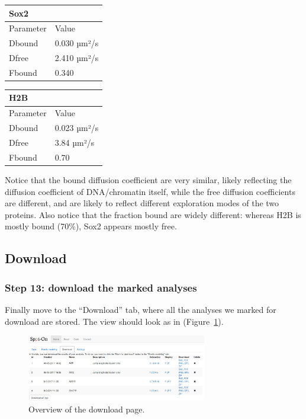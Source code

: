 \begin{center}
  \label{table:table9}
\begin{tabular}{ll}
Sox2 & \\
\hline
Parameter & Value\\
\hline
Dbound & 0.030 µm²/s\\
Dfree & 2.410 µm²/s\\
Fbound & 0.340\\
\end{tabular}
\end{center}

\begin{center}
  \label{table:table10}
\begin{tabular}{ll}
H2B & \\
\hline
Parameter & Value\\
\hline
Dbound & 0.023 µm²/s\\
Dfree & 3.84 µm²/s\\
Fbound & 0.70\\
\end{tabular}
\end{center}

Notice that the bound diffusion coefficient are very similar, likely reflecting the diffusion coefficient of DNA/chromatin itself, while the free diffusion coefficients are different, and are likely to reflect different exploration modes of the two proteins. Also notice that the fraction bound are widely different: whereas H2B is mostly bound (70\%), Sox2 appears mostly free.

\subsection{Download}
\subsubsection{Step 13: download the marked analyses}
Finally move to the ``Download'' tab, where all the analyses we marked for download are stored. The view should look as in (Figure~\ref{fig:tuto14}).

\begin{figure}[h!]
\centering
\includegraphics[width=0.7\textwidth]{../SPTGUI/static/SPTGUI/img/tutorial/0.7/tuto14.png}
\caption{\label{fig:tuto14}Overview of the download page.}
\end{figure}


